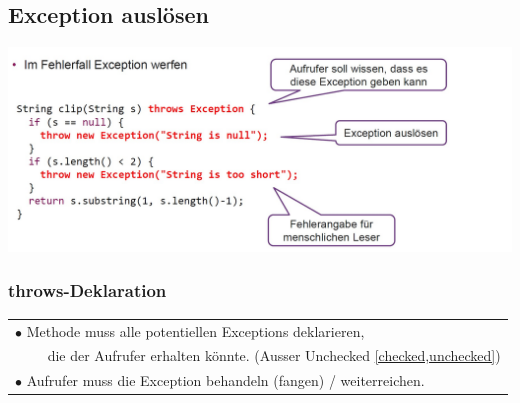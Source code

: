 {\subsection{Exception auslösen}
    \includegraphics[width=0.85\linewidth]{pictures/exception-throw.jpg}
    \vspace{-0.3cm}

    \subsubsection{throws-Deklaration}
        \begin{tabular}{l}
            $\bullet$ Methode muss alle potentiellen Exceptions deklarieren,\\
            $\qquad$ die der Aufrufer erhalten könnte. (Ausser Unchecked \ref{checked,unchecked})\\
            $\bullet$ Aufrufer muss die Exception behandeln (fangen) / weiterreichen.\\
        \end{tabular}
        \vspace{-0.3cm}

}

